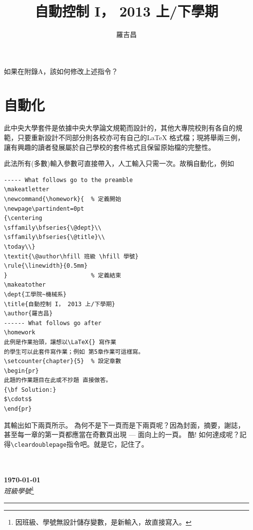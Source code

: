 \begin{appendB}
如果在附錄A，該如何修改上述指令？
\vfil
\newpage
\section{自動化} 
此中央大學套件是依據中央大學論文規範而設計的，其他大專院校則有各自的規範，只要重新設計不同部分則各校亦可有自己的\LaTeX{} 格式檔；現將舉兩三例，讓有興趣的讀者發展屬於自己學校的套件格式且保留原始檔的完整性。

此法所有(多數)輸入參數可直接帶入，人工輸入只需一次。故稱自動化，例如
\begin{Verbatim}[frame=single,firstline=1,lastline=30,rulecolor=\color{red},label=Homework title page]
----- What follows go to the preamble
\makeatletter
\newcommand{\homework}{  % 定義開始
\newpage\partindent=0pt
{\centering
\sffamily\bfseries{\@dept}\\
\sffamily\bfseries{\@title}\\
\today\\}
\textit{\@author\hfill 班級 \hfill 學號}
\rule{\linewidth}{0.5mm}
}                        % 定義結束
\makeatother
\dept{工學院~機械系}
\title{自動控制 I， 2013 上/下學期}
\author{羅吉昌}
------ What follows go after 
\homework  
此例是作業抬頭，讓想以\LaTeX{} 寫作業
的學生可以此套件寫作業；例如 第5章作業可這樣寫。
\setcounter{chapter}{5}  % 設定章數
\begin{pr}
此題的作業題目在此或不抄題 直接做答。
{\bf Solution:}
$\cdots$
\end{pr}
\end{Verbatim}       
其輸出如下兩頁所示。
為何不是下一頁而是下兩頁呢？因為封面，摘要，謝誌，甚至每一章的第一頁都應當在奇數頁出現 --- 面向上的一頁。 酷! 如何達成呢？記得\verb|\cleardoublepage|指令吧。就是它，記住了。
\cleardoublepage{}
{}
\makeatletter
\newcommand{\homework}{%
\newpage                              
\setlength{\parindent}{0pt}  
{\centering
\sffamily\bfseries{\@dept}\\  
\sffamily\bfseries{\@title}\\
\today\\}
\textit{\@author\hfill 班級\hfill 學號}\footnote{因班級、學號無設計儲存變數，是新輸入，故直接寫入。} 
\rule{\linewidth}{0.5mm} 
}
\makeatother
{}
\title{自動控制 I， 2013 上/下學期}
\author{羅吉昌}
\homework
{}
 


\end{appendB}

